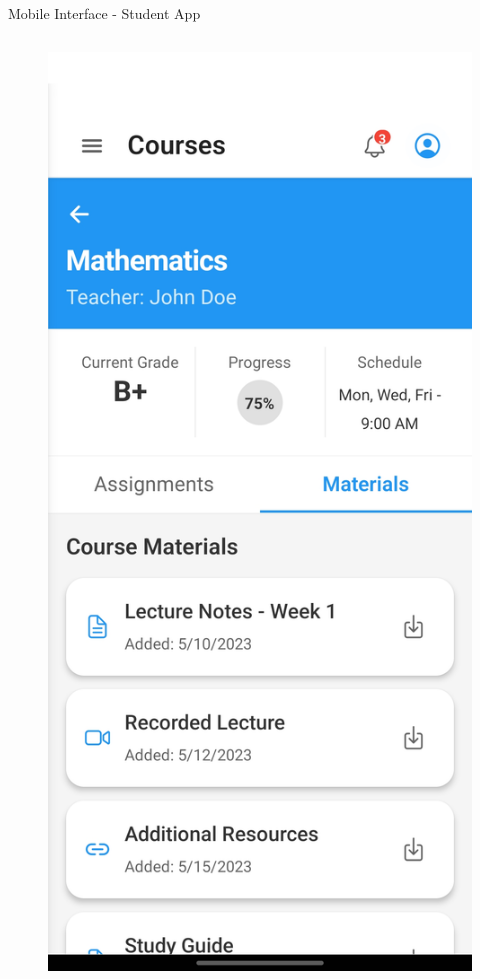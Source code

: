 \documentclass[aspectratio=169]{beamer}
\begin{document}
\begin{frame}{Mobile Interface - Student App}
    \begin{columns}
        \begin{figure}
            \includegraphics[width=\textwidth,height=0.6\textheight,keepaspectratio]{../pfe-pics/Mobile /Students/Screenshot_20250610_130150_Expo Go.jpg}

\end{figure}
\end{columns}
\end{frame}
\end{document}
